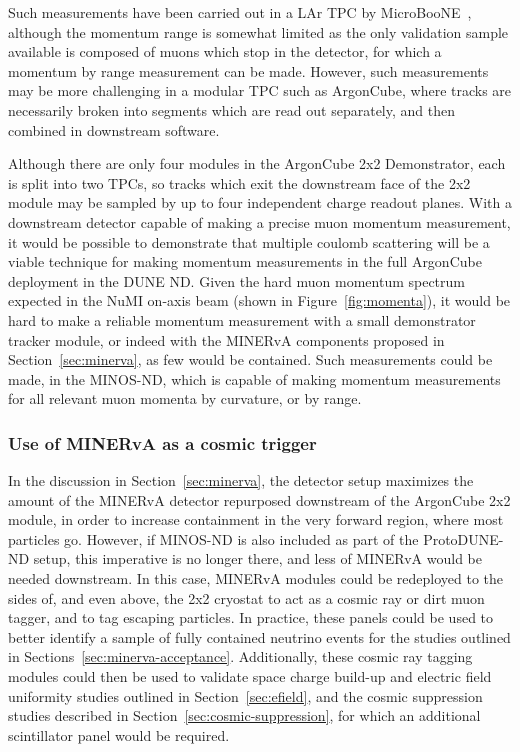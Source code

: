 Such measurements have been carried out in a LAr TPC by MicroBooNE~\cite{Abratenko:2017nki}, although the momentum range is somewhat limited as the only validation sample available is composed of muons which stop in the detector, for which a momentum by range measurement can be made. However, such measurements may be more challenging in a modular TPC such as ArgonCube, where tracks are necessarily broken into segments which are read out separately, and then combined in downstream software.

Although there are only four modules in the ArgonCube 2x2 Demonstrator, each is split into two TPCs, so tracks which exit the downstream face of the 2x2 module may be sampled by up to four independent charge readout planes. With a downstream detector capable of making a precise muon momentum measurement, it would be possible to demonstrate that multiple coulomb scattering will be a viable technique for making momentum measurements in the full ArgonCube deployment in the DUNE ND. Given the hard muon momentum spectrum expected in the NuMI on-axis beam (shown in Figure~\ref{fig:momenta}), it would be hard to make a reliable momentum measurement with a small demonstrator tracker module, or indeed with the MINERvA components proposed in Section~\ref{sec:minerva}, as few would be contained. Such measurements could be made, in the MINOS-ND, which is capable of making momentum measurements for all relevant muon momenta by curvature, or by range.

\subsubsection{Use of MINERvA as a cosmic trigger}
In the discussion in Section~\ref{sec:minerva}, the detector setup maximizes the amount of the MINERvA detector repurposed downstream of the ArgonCube 2x2 module, in order to increase containment in the very forward region, where most particles go. However, if MINOS-ND is also included as part of the ProtoDUNE-ND setup, this imperative is no longer there, and less of MINERvA would be needed downstream. In this case, MINERvA modules could be redeployed to the sides of, and even above, the 2x2 cryostat to act as a cosmic ray or dirt muon tagger, and to tag escaping particles. In practice, these panels could be used to better identify a sample of fully contained neutrino events for the studies outlined in Sections~\ref{sec:minerva-acceptance}. Additionally, these cosmic ray tagging modules could then be used to validate space charge build-up and electric field uniformity studies outlined in Section~\ref{sec:efield}, and the cosmic suppression studies described in Section~\ref{sec:cosmic-suppression}, for which an additional scintillator panel would be required.

